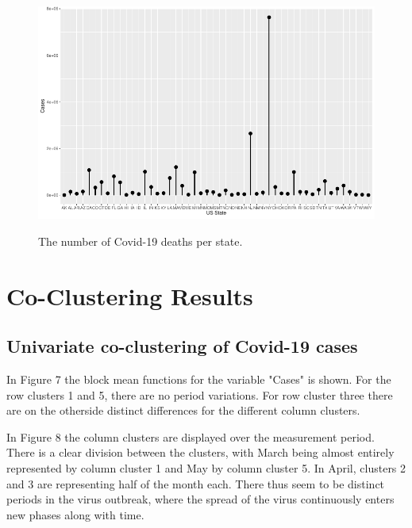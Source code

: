 \documentclass[12pt,a4paper]{article}
\begin{document}
\begin{figure}
	\includegraphics[width=\columnwidth]{NumberOfDeaths.pdf}
	\label{fig5}
	\caption{The number of Covid-19 deaths per state.}
\end{figure}

\section{Co-Clustering Results}

\subsection{Univariate co-clustering of Covid-19 cases}
In Figure 7 the block mean functions for the variable "Cases" is shown. For the row clusters 1 and 5, there are no period variations. For row cluster three there are on the otherside distinct differences for the different column clusters.

In Figure 8 the column clusters are displayed over the measurement period. There is a clear division between the clusters, with March being almost entirely represented by column cluster 1 and May by column cluster 5. In April, clusters 2 and 3 are representing half of the month each. There thus seem to be distinct periods in the virus outbreak, where the spread of the virus continuously enters new phases along with time. 
\end{document}
